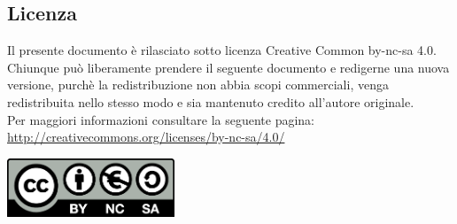 \subsection{Licenza}
Il presente documento è rilasciato sotto licenza Creative Common by-nc-sa 4.0. \\
Chiunque può liberamente prendere il seguente documento e redigerne una nuova
versione, purchè la redistribuzione non abbia scopi commerciali,
venga redistribuita nello stesso modo e sia mantenuto credito all’autore
originale. \\
Per maggiori informazioni consultare la seguente pagina: \\
\url{http://creativecommons.org/licenses/by-nc-sa/4.0/}
\begin{center}
\includegraphics[width=50mm]{analisi/img/by-nc-sa.png}
\end{center}
